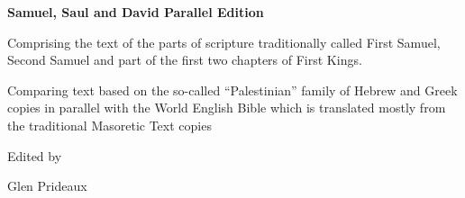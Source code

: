 \begin{titlepage}
\thispagestyle{empty}

\vspace*{\fill}

\begin{center}

{\Huge\bfseries Samuel, Saul and David Parallel Edition\par}
\end{center}

\vspace{1.5em}
Comprising the text of the parts of scripture traditionally called First
Samuel, Second Samuel and part of the first two chapters of First Kings.

\vspace{1.5em}
{\Large
Comparing text based on the so-called ``Palestinian'' family of Hebrew and Greek
copies
in parallel with the World English Bible which is translated mostly from the
traditional Masoretic Text copies\par}

\vspace{3em}

\begin{center}
{\large Edited by\par}

\vspace{0.5em}

{\Large Glen Prideaux\par}

\end{center}

\vspace*{\fill}

\end{titlepage}